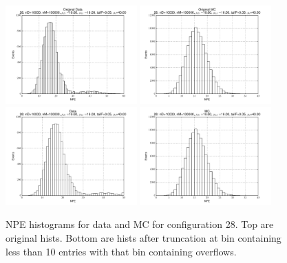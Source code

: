  \begin{figure}[htbp] \begin{center} 
\includegraphics[width=0.45\textwidth]{../FIGURES/28/FIG_Original_Data.pdf} 
\includegraphics[width=0.45\textwidth]{../FIGURES/28/FIG_Original_MC.pdf} 
\includegraphics[width=0.45\textwidth]{../FIGURES/28/FIG_Data.pdf} 
\includegraphics[width=0.45\textwidth]{../FIGURES/28/FIG_MC.pdf} 
\caption{NPE histograms for data and MC for configuration 28. Top are original hists. Bottom are hists after truncation at bin containing less than 10 entries with that bin containing overflows.} 
\label{tab:npe_28} 
\end{center} \end{figure} 

 